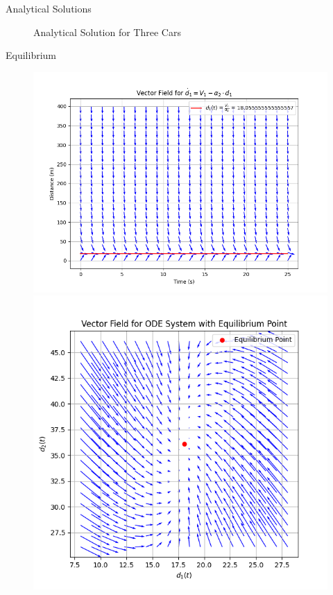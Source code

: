 \documentclass{beamer}
\begin{document}
\begin{frame}{Analytical Solutions}
\begin{figure}[H]
\begin{minipage}[t]{0.49\linewidth}
			\caption{Analytical Solution for Three Cars}
			\label{fig:AnalyticalSolution}
		\end{minipage}\hfill
		\label{fig:CombinedFigures}
	\end{figure}
\end{frame}

\begin{frame}{Equilibrium}
	\begin{figure}[H]
		\centering
		\begin{minipage}[t]{0.45\textwidth}
			\centering
			\includegraphics[width=\linewidth]{FieldOfVector_CV.png}
		\end{minipage}
		\hfill 
		\begin{minipage}[t]{0.45\textwidth}
			\centering
			\includegraphics[width=\linewidth]{FieldOfVector_CV2.png}

\end{minipage}
\end{figure}
\end{frame}
\end{document}
